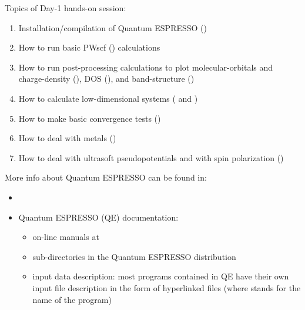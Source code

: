\documentclass[landscape]{foils}
\begin{document}
\blue

Topics of Day-1 hands-on session:
\begin{enumerate}
\item Installation/compilation of Quantum ESPRESSO ()
\item How to run basic PWscf () calculations
\item How to run post-processing calculations to plot
  molecular-orbitals and charge-density (), DOS
  (), and band-structure ()
\item How to calculate low-dimensional systems ( and
  )
\item How to make basic convergence tests ()
\item How to deal with metals ()
\item How to deal with ultrasoft pseudopotentials and with spin polarization
  ()
\end{enumerate}

More info about Quantum ESPRESSO can be found in:
\begin{itemize}
\item {}
\item Quantum ESPRESSO (QE) documentation:
  \begin{itemize}
  \item on-line manuals at
    \\
    
  \item {} sub-directories in the {\sc Quantum ESPRESSO}
    distribution\\
    
  \item input data description: most programs contained in QE have
    their own input file description in the form of hyperlinked
     files (where \file{***} stands for the name
    of the program)
  \end{itemize}
\end{itemize}

\end{document}

